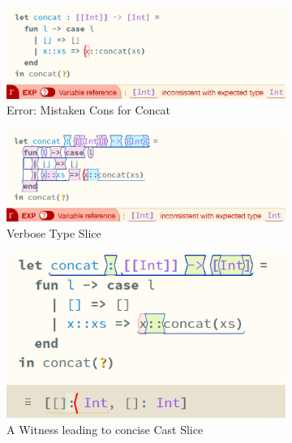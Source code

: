 \begin{figure}[H]
\centering
\begin{subfigure}{0.49\textwidth}
\centering
\includegraphics[width=1\textwidth]{Media/Figures/concat_error}
\caption{Error: Mistaken Cons for Concat}
\end{subfigure}
\begin{subfigure}{0.49\textwidth}
\centering
\includegraphics[width=1\textwidth]{Media/Figures/concat_error_type_slice}
\caption{Verbose Type Slice}
\end{subfigure}
\begin{subfigure}{0.49\textwidth}
\centering
\includegraphics[width=1\textwidth]{Media/Figures/concat_error_cast_slice}
\caption{A Witness \code{([[], []])} leading to concise Cast Slice}
\end{subfigure}
\begin{subfigure}{0.49\textwidth}
\centering

\end{subfigure}
\end{figure}
